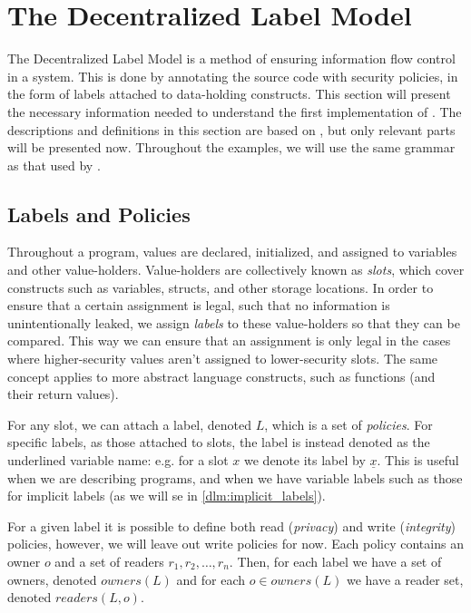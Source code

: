 
\newcommand{\labelof}[1]{\underline{#1}}
\newcommand{\dlmc}[1]{\lstinline[style=dlmc]{#1}}
\newcommand{\dlmactsfor}{\dlmc{if\_acts\_for}}
\newcommand{\dlmdeclassify}{\dlmc{declassify}}
\newcommand{\dlmpc}{$\underline{pc}$}
\newcommand{\mathcomment}[1]{\color{green!50!black}{#1}}

\section{The Decentralized Label Model}
The Decentralized Label Model \cite{myers1997, myers1998, myers2000} is a method of ensuring information flow control in a system.
This is done by annotating the source code with security policies, in the form of labels attached to data-holding constructs.
This section will present the necessary information needed to understand the first implementation of \thetool.
The descriptions and definitions in this section are based on \cite{myers1997, myers1998, myers2000}, but only relevant parts will be presented now.
Throughout the examples, we will use the same grammar as that used by \thetool.

\subsection{Labels and Policies}
Throughout a program, values are declared, initialized, and assigned to variables and other value-holders.
Value-holders are collectively known as \emph{slots}, which cover constructs such as variables, structs, and other storage locations.
In order to ensure that a certain assignment is legal, such that no information is unintentionally leaked, we assign \emph{labels} to these value-holders so that they can be compared.
This way we can ensure that an assignment is only legal in the cases where higher-security values aren't assigned to lower-security slots.
The same concept applies to more abstract language constructs, such as functions (and their return values).

For any slot, we can attach a label, denoted $L$, which is a set of \emph{policies}.
For specific labels, as those attached to slots, the label is instead denoted as the underlined variable name: e.g. for a slot $x$ we denote its label by $\underline{x}$.
This is useful when we are describing programs, and when we have variable labels such as those for implicit labels (as we will se in \cref{dlm:implicit_labels}).

For a given label it is possible to define both read (\emph{privacy}) and write (\emph{integrity}) policies, however, we will leave out write policies for now.
Each policy contains an owner $o$ and a set of readers $r_1,r_2,\dots,r_n$.
Then, for each label we have a set of owners, denoted $owners(L)$ and for each $o \in owners(L)$ we have a reader set, denoted $readers(L, o)$.

